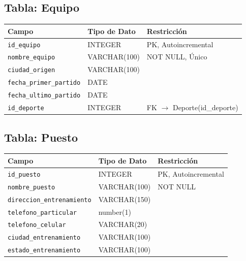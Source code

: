 \documentclass{article}
\begin{document}
\subsection*{Tabla: Equipo}
\begin{center}
\begin{tabular}{|l|l|p{6cm}|}
\hline
\textbf{Campo} & \textbf{Tipo de Dato} & \textbf{Restricción} \\
\hline
\texttt{id\_equipo} & INTEGER & PK, Autoincremental \\
\texttt{nombre\_equipo} & VARCHAR(100) & NOT NULL, Único \\
\texttt{ciudad\_origen} & VARCHAR(100) &  \\
\texttt{fecha\_primer\_partido} & DATE &  \\
\texttt{fecha\_ultimo\_partido} & DATE &  \\
\texttt{id\_deporte} & INTEGER & FK $\rightarrow$ Deporte(id\_deporte) \\
\hline
\end{tabular}
\end{center}

\subsection*{Tabla: Puesto}
\begin{center}
\begin{tabular}{|l|l|p{6cm}|}
\hline
\textbf{Campo} & \textbf{Tipo de Dato} & \textbf{Restricción} \\
\hline
\texttt{id\_puesto} & INTEGER & PK, Autoincremental \\
\texttt{nombre\_puesto} & VARCHAR(100) & NOT NULL \\
\texttt{direccion\_entrenamiento} & VARCHAR(150) &  \\
\texttt{telefono\_particular} & number(1) &  \\
\texttt{telefono\_celular} & VARCHAR(20) &  \\
\texttt{ciudad\_entrenamiento} & VARCHAR(100) &  \\
\texttt{estado\_entrenamiento} & VARCHAR(100) &  \\
\hline
\end{tabular}
\end{center}

\end{document}
